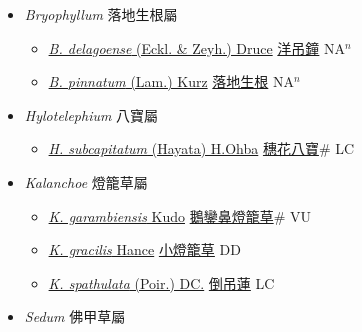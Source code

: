 
  \begin{itemize}
 \item[] \textit{Bryophyllum} 落地生根屬
                    
  \begin{itemize}
        \item[] \href{http://www.theplantlist.org/tpl1.1/search?q=Bryophyllum+delagoense}{\textit{B. delagoense} (Eckl. \& Zeyh.) Druce}   \href{\detokenize{http://taibnet.sinica.edu.tw/chi/taibnet_species_list.php?T2=洋吊鐘&T2_new_value=true&fr=y}}{洋吊鐘} NA$^n$
        \item[] \href{http://www.theplantlist.org/tpl1.1/search?q=Bryophyllum+pinnatum}{\textit{B. pinnatum} (Lam.) Kurz}   \href{\detokenize{http://taibnet.sinica.edu.tw/chi/taibnet_species_list.php?T2=落地生根&T2_new_value=true&fr=y}}{落地生根} NA$^n$
  \end{itemize}
 \item[] \textit{Hylotelephium} 八寶屬
                    
  \begin{itemize}
        \item[] \href{http://www.theplantlist.org/tpl1.1/search?q=Hylotelephium+subcapitatum}{\textit{H. subcapitatum} (Hayata) H.Ohba}   \href{\detokenize{http://taibnet.sinica.edu.tw/chi/taibnet_species_list.php?T2=穗花八寶&T2_new_value=true&fr=y}}{穗花八寶}\# LC
  \end{itemize}
 \item[] \textit{Kalanchoe} 燈籠草屬
                    
  \begin{itemize}
        \item[] \href{http://www.theplantlist.org/tpl1.1/search?q=Kalanchoe+garambiensis}{\textit{K. garambiensis} Kudo}   \href{\detokenize{http://taibnet.sinica.edu.tw/chi/taibnet_species_list.php?T2=鵝鑾鼻燈籠草&T2_new_value=true&fr=y}}{鵝鑾鼻燈籠草}\# VU
        \item[] \href{http://www.theplantlist.org/tpl1.1/search?q=Kalanchoe+gracilis}{\textit{K. gracilis} Hance}   \href{\detokenize{http://taibnet.sinica.edu.tw/chi/taibnet_species_list.php?T2=小燈籠草&T2_new_value=true&fr=y}}{小燈籠草} DD
        \item[] \href{http://www.theplantlist.org/tpl1.1/search?q=Kalanchoe+spathulata}{\textit{K. spathulata} (Poir.) DC.}   \href{\detokenize{http://taibnet.sinica.edu.tw/chi/taibnet_species_list.php?T2=倒吊蓮&T2_new_value=true&fr=y}}{倒吊蓮} LC
  \end{itemize}
 \item[] \textit{Sedum} 佛甲草屬
                    

\end{itemize}
